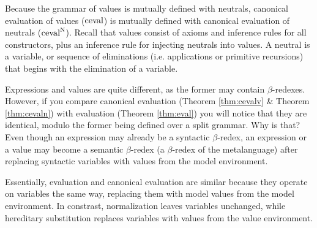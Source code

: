\documentclass{llncs}
\newcommand{\refthm}[1]{Theorem \ref{thm:#1}}
\def\cevalv{\fun{ceval}}
\def\cevaln{\fun{ceval}^\con{N}}
\newcommand{\con}[1]{\textmd{#1}}
\newcommand{\fun}[1]{\textmd{#1}}
\begin{document}
Because the grammar of values is mutually defined with neutrals,
canonical evaluation of values ($\cevalv$) is mutually defined with canonical
evaluation of neutrals ($\cevaln$). Recall that values consist of axioms and
inference rules for all constructors, plus an inference rule for
injecting neutrals into values. A neutral is a variable, or 
sequence of eliminations (i.e. applications or primitive recursions)
that begins with the elimination of a variable.

Expressions and values are quite different, as the former
may contain $\beta$-redexes. However, if you compare
canonical evaluation (\refthm{cevalv} \& \refthm{cevaln}) with
evaluation (\refthm{eval}) you will notice that they are identical,
modulo the former being defined over a split grammar. Why is that?
Even though an expression may already be a syntactic $\beta$-redex, an
expression or a value may become a semantic $\beta$-redex (a
$\beta$-redex of the metalanguage) after replacing syntactic variables
with values from the model environment. 

Essentially, evaluation and canonical evaluation are similar because
they operate on variables the same way, replacing them with model
values from the model environment. In constrast,
normalization leaves variables unchanged, while hereditary
substitution replaces variables with values from the value
environment. 
\end{document}
